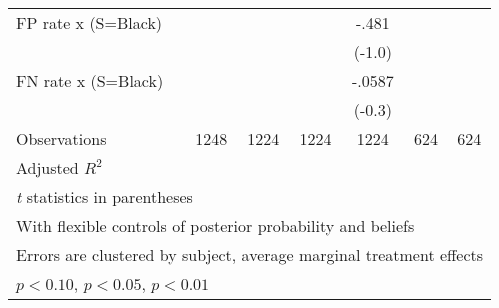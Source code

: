 \begin{table}[htbp]
\begin{tabular}{l*{6}{c}}
FP rate x (S=Black)&                  &                  &                  &    -.481         &                  &                  \\
                &                  &                  &                  &   (-1.0)         &                  &                  \\
FN rate x (S=Black)&                  &                  &                  &   -.0587         &                  &                  \\
                &                  &                  &                  &   (-0.3)         &                  &                  \\
\hline
Observations    &     1248         &     1224         &     1224         &     1224         &      624         &      624         \\
Adjusted \(R^{2}\)&                  &                  &                  &                  &                  &                  \\
\hline\hline
\multicolumn{7}{l}{\footnotesize \textit{t} statistics in parentheses}\\
\multicolumn{7}{l}{\footnotesize With flexible controls of posterior probability and beliefs}\\
\multicolumn{7}{l}{\footnotesize Errors are clustered by subject, average marginal treatment effects}\\
\multicolumn{7}{l}{\footnotesize \sym{*} \(p<0.10\), \sym{**} \(p<0.05\), \sym{***} \(p<0.01\)}\\
\end{tabular}
\end{table}
